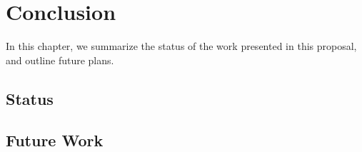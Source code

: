 
\chapter{Conclusion}
\label{chap:conclusion}

In this chapter, we summarize the status of the work presented in this proposal, and outline future plans.

\section{Status}
\label{sec:conclusion:status}

\section{Future Work}
\label{sec:conclusion:future-work}


